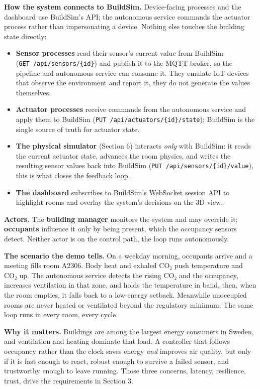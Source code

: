 \documentclass[
  11pt,
]{article}
\providecommand{\tightlist}{%
  \setlength{\itemsep}{0pt}\setlength{\parskip}{0pt}}
\begin{document}
\textbf{How the system connects to BuildSim.} Device-facing processes and the
dashboard use BuildSim's API; the autonomous service commands the actuator
process rather than impersonating a device. Nothing else touches the building
state directly:

\begin{itemize}
\tightlist
\item
  \textbf{Sensor processes} read their sensor's current value from
  BuildSim (\texttt{GET\ /api/sensors/\{id\}}) and publish it to the MQTT broker, so the pipeline and autonomous service can consume it. They
  emulate IoT devices that observe the environment and report it, they
  do not generate the values themselves.
\item
  \textbf{Actuator processes} receive commands from the autonomous
  service and apply them to BuildSim
  (\texttt{PUT\ /api/actuators/\{id\}/state}); BuildSim is the single
  source of truth for actuator state.
\item
  \textbf{The physical simulator} (Section 6) interacts \emph{only} with
  BuildSim: it reads the current actuator state, advances the room
  physics, and writes the resulting sensor values back into BuildSim
  (\texttt{PUT\ /api/sensors/\{id\}/value}), this is what closes the
  feedback loop.
\item
  \textbf{The dashboard} subscribes to BuildSim's WebSocket session API
  to highlight rooms and overlay the system's decisions on the 3D view.
\end{itemize}

\textbf{Actors.} The \textbf{building manager} monitors the system and
may override it; \textbf{occupants} influence it only by being present,
which the occupancy sensors detect. Neither actor is on the control path, the loop runs autonomously.

\textbf{The scenario the demo tells.} On a weekday morning, occupants
arrive and a meeting fills room A2306. Body heat and exhaled CO₂ push
temperature and CO₂ up. The autonomous service detects the rising CO₂
and the occupancy, increases ventilation in that zone, and holds the
temperature in band, then, when the room empties, it falls back to a
low-energy setback. Meanwhile unoccupied rooms are never heated or
ventilated beyond the regulatory minimum. The same loop runs in every
room, every cycle.

\textbf{Why it matters.} Buildings are among the largest energy
consumers in Sweden, and ventilation and heating dominate that load. A
controller that follows occupancy rather than the clock saves energy
\emph{and} improves air quality, but only if it is fast enough to react,
robust enough to survive a failed sensor, and trustworthy enough to
leave running. Those three concerns, latency, resilience, trust, drive the requirements in Section 3.
\end{document}
